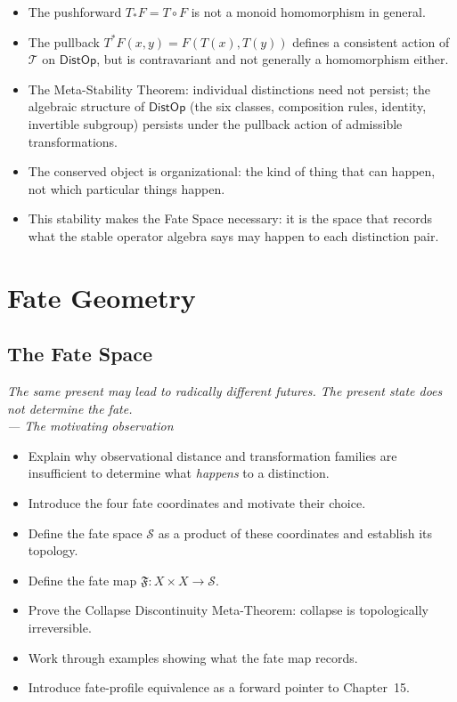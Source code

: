 \documentclass[12pt,twoside,openright]{book}
\newcommand{\transfam}{\mathcal{T}}       %
\newcommand{\fateMap}{\mathfrak{F}}
\newcommand{\fateSpace}{\mathcal{S}}
\newcommand{\distOp}{\mathsf{DistOp}}
\newenvironment{epigraph}[2]{%
  \vspace{1em}\begin{flushright}
  \begin{minipage}{0.72\textwidth}
  \itshape\small #1\\[0.4em]
  \upshape\footnotesize\sffamily\color{DistGray}--- #2
  \end{minipage}\end{flushright}\vspace{1.5em}}{}
\newenvironment{objectives}{%
  \begin{tcolorbox}[colback=DistBlue!5,colframe=DistBlue,
    title={\faCheckCircle\enspace Chapter Objectives},
    fonttitle=\sffamily\bfseries\color{white},
    attach boxed title to top left={yshift=-2mm,xshift=4mm},
    boxed title style={colback=DistBlue},breakable]
  \begin{itemize}[leftmargin=*,nosep]}{%
  \end{itemize}\end{tcolorbox}\vspace{1em}}
\newenvironment{chapsummary}{%
  \begin{tcolorbox}[colback=DistBlue!5,colframe=DistBlue,
    title={\faBookOpen\enspace Summary},
    fonttitle=\sffamily\bfseries\color{white},
    attach boxed title to top left={yshift=-2mm,xshift=4mm},
    boxed title style={colback=DistBlue,rounded corners}]
  \begin{itemize}[nosep,leftmargin=*]}{%
  \end{itemize}\end{tcolorbox}}
\begin{document}
\begin{chapsummary}
\item The pushforward $T_*F=T\circ F$ is not a monoid
  homomorphism in general.
\item The pullback $T^*F(x,y)=F(T(x),T(y))$ defines a
  consistent action of $\transfam$ on $\distOp$, but is
  contravariant and not generally a homomorphism either.
\item The Meta-Stability Theorem: individual distinctions need
  not persist; the algebraic structure of $\distOp$ (the six
  classes, composition rules, identity, invertible subgroup)
  persists under the pullback action of admissible
  transformations.
\item The conserved object is organizational: the kind of
  thing that can happen, not which particular things happen.
\item This stability makes the Fate Space necessary: it is the
  space that records what the stable operator algebra says may
  happen to each distinction pair.
\end{chapsummary}

\part{Fate Geometry}



\chapter{The Fate Space}
\label{ch:fate-space}

\begin{epigraph}{The same present may lead to radically different
  futures. The present state does not determine the fate.}%
  {The motivating observation}
\end{epigraph}

\begin{objectives}
\item Explain why observational distance and transformation
  families are insufficient to determine what \emph{happens}
  to a distinction.
\item Introduce the four fate coordinates and motivate their
  choice.
\item Define the fate space $\fateSpace$ as a product of these
  coordinates and establish its topology.
\item Define the fate map $\fateMap:X\times X\to\fateSpace$.
\item Prove the Collapse Discontinuity Meta-Theorem: collapse
  is topologically irreversible.
\item Work through examples showing what the fate map records.
\item Introduce fate-profile equivalence as a forward pointer
  to Chapter~15.
\end{objectives}
\end{document}
